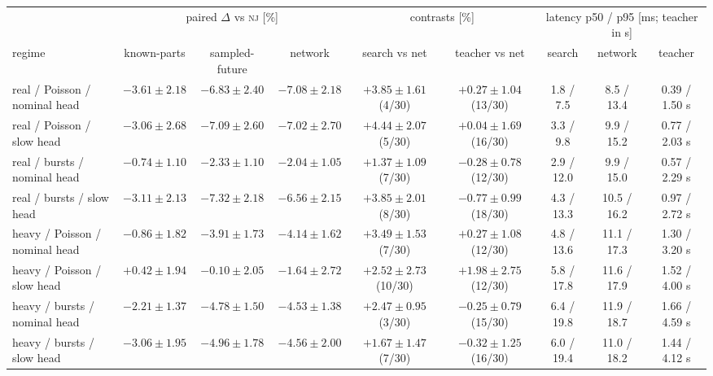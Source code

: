 \begin{tabular}{@{}lccc|cc|ccc@{}}
\toprule
 & \multicolumn{3}{c|}{paired $\Delta$ vs \textsc{nj} [\%]} & \multicolumn{2}{c|}{contrasts [\%]} & \multicolumn{3}{c}{latency p50 / p95 [ms; teacher in s]} \\
regime & known-parts & sampled-future & network & search vs net & teacher vs net & search & network & teacher \\
\midrule
real / Poisson / nominal head & {\boldmath$-3.61 \pm 2.18$} & {\boldmath$-6.83 \pm 2.40$} & {\boldmath$-7.08 \pm 2.18$} & {\boldmath$+3.85 \pm 1.61$} (4/30) & $+0.27 \pm 1.04$ (13/30) & 1.8 / 7.5 & 8.5 / 13.4 & 0.39 / 1.50 s \\
real / Poisson / slow head & {\boldmath$-3.06 \pm 2.68$} & {\boldmath$-7.09 \pm 2.60$} & {\boldmath$-7.02 \pm 2.70$} & {\boldmath$+4.44 \pm 2.07$} (5/30) & $+0.04 \pm 1.69$ (16/30) & 3.3 / 9.8 & 9.9 / 15.2 & 0.77 / 2.03 s \\
real / bursts / nominal head & $-0.74 \pm 1.10$ & {\boldmath$-2.33 \pm 1.10$} & {\boldmath$-2.04 \pm 1.05$} & {\boldmath$+1.37 \pm 1.09$} (7/30) & $-0.28 \pm 0.78$ (12/30) & 2.9 / 12.0 & 9.9 / 15.0 & 0.57 / 2.29 s \\
real / bursts / slow head & {\boldmath$-3.11 \pm 2.13$} & {\boldmath$-7.32 \pm 2.18$} & {\boldmath$-6.56 \pm 2.15$} & {\boldmath$+3.85 \pm 2.01$} (8/30) & $-0.77 \pm 0.99$ (18/30) & 4.3 / 13.3 & 10.5 / 16.2 & 0.97 / 2.72 s \\
heavy / Poisson / nominal head & $-0.86 \pm 1.82$ & {\boldmath$-3.91 \pm 1.73$} & {\boldmath$-4.14 \pm 1.62$} & {\boldmath$+3.49 \pm 1.53$} (7/30) & $+0.27 \pm 1.08$ (12/30) & 4.8 / 13.6 & 11.1 / 17.3 & 1.30 / 3.20 s \\
heavy / Poisson / slow head & $+0.42 \pm 1.94$ & $-0.10 \pm 2.05$ & $-1.64 \pm 2.72$ & $+2.52 \pm 2.73$ (10/30) & $+1.98 \pm 2.75$ (12/30) & 5.8 / 17.8 & 11.6 / 17.9 & 1.52 / 4.00 s \\
heavy / bursts / nominal head & {\boldmath$-2.21 \pm 1.37$} & {\boldmath$-4.78 \pm 1.50$} & {\boldmath$-4.53 \pm 1.38$} & {\boldmath$+2.47 \pm 0.95$} (3/30) & $-0.25 \pm 0.79$ (15/30) & 6.4 / 19.8 & 11.9 / 18.7 & 1.66 / 4.59 s \\
heavy / bursts / slow head & {\boldmath$-3.06 \pm 1.95$} & {\boldmath$-4.96 \pm 1.78$} & {\boldmath$-4.56 \pm 2.00$} & {\boldmath$+1.67 \pm 1.47$} (7/30) & $-0.32 \pm 1.25$ (16/30) & 6.0 / 19.4 & 11.0 / 18.2 & 1.44 / 4.12 s \\
\bottomrule
\end{tabular}

